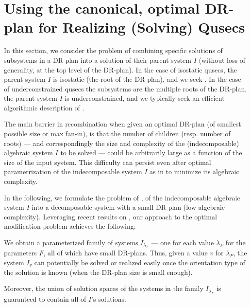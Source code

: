 \section{Using the canonical, optimal DR-plan for Realizing (Solving) Qusecs}
\label{sec:recomb}
%
In this section, we consider the  problem
of combining specific solutions of subsystems in a DR-plan into a
solution of their parent system $I$ (without loss of generality, at
the top level of the DR-plan). In the case of isostatic qusecs, the
parent system $I$ is isostatic (the root of the DR-plan), and we seek
. In the case of underconstrained
qusecs the subsystems are the multiple roots of the DR-plan, the
parent system $I$ is underconstrained, and we typically seek an
efficient algorithmic description of .

The main barrier in recombination when given an optimal DR-plan (of
smallest possible size or max fan-in),  is that the number of children
(resp. number of roots) --- and correspondingly the  size and complexity
of the (indecomposable) algebraic system $I$ to be solved --- could be
arbitrarily large as a function of the size of the input system. This
difficulty can persist even after optimal parametrization of the
indecomposable system $I$ as in \cite{sitharam2010optimized} to minimize its algebraic
complexity.

In the following, we formulate the problem of , of the indecomposable algebraic system $I$ into a
decomposable system with a small DR-plan (low algebraic complexity).
Leveraging recent results on , our
approach to the optimal modification problem achieves the following:

\medskip\noindent
{} We obtain a  parameterized family of systems
$I_{\lambda_F}$ --- one for each value $\lambda_F$ for the parameters
$F$,  all of which have small DR-plans. Thus, given a value $v$ for
$\lambda_F$, the system $I_v$ can potentially be solved or realized
easily once the orientation type of the solution is known  (when the
DR-plan size is small enough).

\medskip\noindent
{}
Moreover, the union of solution spaces of the systems in the family
$I_{\lambda_F}$ is guaranteed to contain all of $I$'s solutions.

